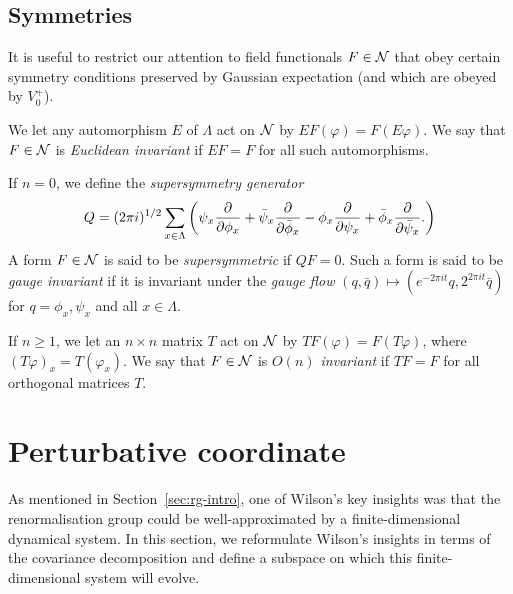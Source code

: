 \subsection{Symmetries}

It is useful to restrict our attention to field functionals $F \in \mathcal{N}$ that
obey certain symmetry conditions preserved by Gaussian expectation (and which
are obeyed by $V^+_0$).

We let any automorphism $E$ of $\Lambda$ act on $\mathcal{N}$ by $EF(\varphi) = F(E\varphi)$.
We say that $F\in\mathcal{N}$ is \emph{Euclidean invariant} if $EF = F$ for all such automorphisms.

If $n = 0$,
we define the \emph{supersymmetry generator}
\begin{equation}
Q = (2\pi i)^{1/2} \sum_{x\in\Lambda}
\left(
	\psi_x \frac{\partial }{\partial \phi_x} + \bar\psi_x \frac{\partial }{\partial \bar\phi_x}
		-
	\phi_x \frac{\partial }{\partial \psi_x} + \bar\phi_x \frac{\partial }{\partial \bar\psi_x}.
\right)
\end{equation}
A form $F \in \mathcal{N}$ is said to be \emph{supersymmetric} if $Q F = 0$.
Such a form is said to be \emph{gauge invariant} if it is invariant under the
\emph{gauge flow} $(q, \bar q) \mapsto (e^{-2\pi it} q, 2^{2\pi it} \bar q)$
for $q = \phi_x, \psi_x$ and all $x\in\Lambda$.

If $n \ge 1$, we let
an $n \times n$ matrix $T$ act on $\mathcal{N}$ by $T F(\varphi) = F(T \varphi)$,
where $(T\varphi)_x = T(\varphi_x)$.
We say that $F\in\mathcal{N}$ is \emph{$O(n)$ invariant} if $TF = F$ for all
orthogonal matrices $T$.


\section{Perturbative coordinate}

As mentioned in Section~\ref{sec:rg-intro}, one of Wilson's key insights was that the renormalisation
group could be well-approximated by a finite-dimensional dynamical system. In this
section, we reformulate Wilson's insights in terms of the covariance decomposition
and define a subspace on which this finite-dimensional system will evolve.


